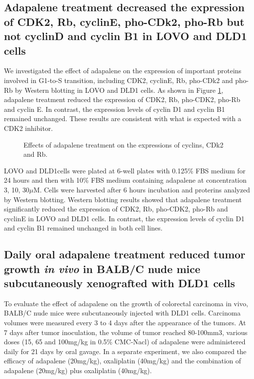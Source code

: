 \subsection{Adapalene treatment decreased the expression of CDK2, Rb, cyclinE, pho-CDk2, pho-Rb but not cyclinD and cyclin B1 in LOVO and DLD1 cells}

We investigated the effect of adapalene on the expression of important proteins involved in G1-to-S transition, including CDK2, cyclinE, Rb, pho-CDk2 and pho-Rb by Western blotting in LOVO and DLD1 cells. As shown in Figure \ref{cdk2:WesternBlot}, adapalene treatment reduced the expression of CDK2, Rb, pho-CDK2, pho-Rb and cyclin E. In contrast, the expression levels of cyclin D1 and cyclin B1 remained unchanged. These results are consistent with what is expected with a CDK2 inhibitor.

\begin{figure}
\centering
\caption{Effects of adapalene treatment on the expressions of cyclins, CDk2 and Rb.}
\label{cdk2:WesternBlot}
\end{figure}
LOVO and DLD1cells were plated at 6-well plates with 0.125\% FBS medium for 24 hours and then with 10\% FBS medium containing adapalene at concentration 3, 10, 30$\mu$M. Cells were harvested after 6 hours incubation and proterins analyzed by Western blotting. Western blotting results showed that adapalene treatment significantly reduced the expression of CDK2, Rb, pho-CDK2, pho-Rb and cyclinE in LOVO and DLD1 cells. In contrast, the expression levels of cyclin D1 and cyclin B1 remained unchanged in both cell lines.

\subsection{Daily oral adapalene treatment reduced tumor growth \textit{in vivo} in BALB/C nude mice subcutaneously xenografted with DLD1 cells}

To evaluate the effect of adapalene on the growth of colorectal carcinoma in vivo, BALB/C nude mice were subcutaneously injected with DLD1 cells. Carcinoma volumes were measured every 3 to 4 days after the appearance of the tumors. At 7 days after tumor inoculation, the volume of tumor reached 80-100mm3, various doses (15, 65 and 100mg/kg in 0.5\% CMC-Nacl) of adapalene were administered daily for 21 days by oral gavage. In a separate experiment, we also compared the efficacy of adapalene (20mg/kg), oxaliplatin (40mg/kg) and the combination of adapalene (20mg/kg) plus oxaliplatin (40mg/kg).

